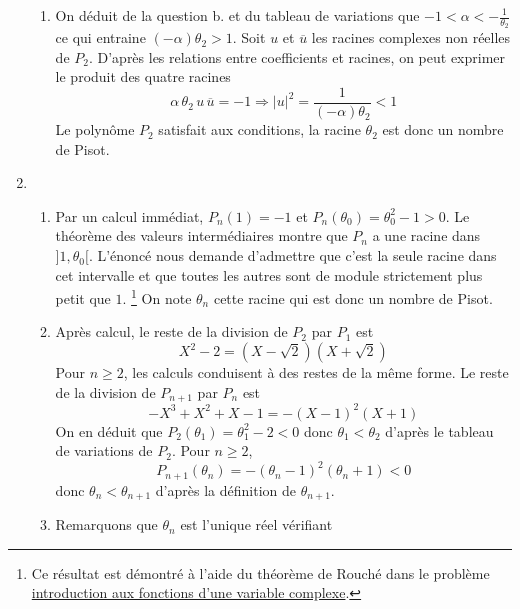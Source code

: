 \begin{enumerate}
\begin{enumerate}
 \item On déduit de la question b. et du tableau de variations que $-1<\alpha < -\frac{1}{\theta_2}$ ce qui entraine $(-\alpha)\theta_2>1$.\newline
Soit $u$ et $\overline{u}$ les racines complexes non réelles de $P_2$. D'après les relations entre coefficients et racines, on peut exprimer le produit des quatre racines
\begin{displaymath}
 \alpha\,\theta_2\,u\,\overline{u} = -1\Rightarrow |u|^2 = \frac{1}{(-\alpha)\theta_2}<1
\end{displaymath}
Le polynôme $P_2$ satisfait aux conditions, la racine $\theta_2$ est donc un nombre de Pisot.
\end{enumerate}

 \item
\begin{enumerate}
 \item Par un calcul immédiat, $P_n(1)=-1$ et $P_n(\theta_0)=\theta_0^2-1>0$. Le théorème des valeurs intermédiaires montre que $P_n$ a une racine dans $]1,\theta_0[$. L'énoncé nous demande d'admettre que c'est la seule racine dans cet intervalle et que toutes les autres sont de module strictement plus petit que $1$. \footnote{Ce résultat est démontré à l'aide du théorème de Rouché dans le problème \og\href{\textesurl Arouche.pdf}{introduction aux fonctions d'une variable complexe}\fg.} On note $\theta_n$ cette racine qui est donc un nombre de Pisot.
 \item Après calcul, le reste de la division de $P_2$ par $P_1$ est
\begin{displaymath}
 X^2-2=(X-\sqrt{2})(X+\sqrt{2})
\end{displaymath}
Pour $n\geq 2$, les calculs conduisent à des restes de la même forme. Le reste de la division de $P_{n+1}$ par $P_n$ est
\begin{displaymath}
 -X^3+X^2+X-1 = -(X-1)^2(X+1)
\end{displaymath}
On en déduit que $P_2(\theta_1)=\theta_1^2-2<0$ donc $\theta_1 < \theta_2$ d'après le tableau de variations de $P_2$.\newline
Pour $n\geq2$, 
\begin{displaymath}
 P_{n+1}(\theta_n)=-(\theta_n-1)^2(\theta_n+1)<0
\end{displaymath}
 donc $\theta_n < \theta_{n+1}$ d'après la définition de $\theta_{n+1}$.
 \item Remarquons que $\theta_n$ est l'unique réel vérifiant
\begin{displaymath}

\end{displaymath}
\end{enumerate}
\end{enumerate}
